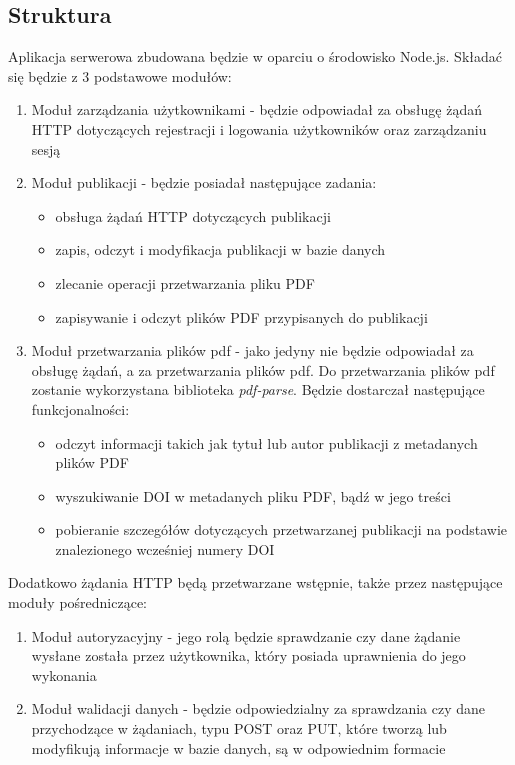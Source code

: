 \documentclass[a4paper,12pt,twoside,openany]{report}
\begin{document}
\subsection{Struktura}
Aplikacja serwerowa zbudowana będzie w oparciu o środowisko Node.js. Składać się będzie z 3 podstawowe modułów:
\begin{enumerate}
	\item Moduł zarządzania użytkownikami - będzie odpowiadał za obsługę żądań HTTP dotyczących rejestracji i logowania użytkowników oraz zarządzaniu sesją
	
	\item Moduł publikacji - będzie posiadał następujące zadania:
	\begin{itemize}
		\item obsługa żądań HTTP dotyczących publikacji
		\item zapis, odczyt i modyfikacja publikacji w bazie danych
		\item zlecanie operacji przetwarzania pliku PDF
		\item zapisywanie i odczyt plików PDF przypisanych do publikacji
	\end{itemize}
	 
	\item Moduł przetwarzania plików pdf - jako jedyny nie będzie odpowiadał za obsługę żądań, a za przetwarzania plików pdf. Do przetwarzania plików pdf zostanie wykorzystana biblioteka \textit{pdf-parse}. Będzie dostarczał następujące funkcjonalności:
	\begin{itemize}
		\item odczyt informacji takich jak tytuł lub autor publikacji z metadanych plików PDF
		\item wyszukiwanie DOI w metadanych pliku PDF, bądź w jego treści
		\item pobieranie szczegółów dotyczących przetwarzanej publikacji na podstawie znalezionego wcześniej numery DOI
	\end{itemize}
\end{enumerate}


Dodatkowo żądania HTTP będą przetwarzane wstępnie, także przez następujące moduły pośredniczące:
\begin{enumerate}
	\item Moduł autoryzacyjny - jego rolą będzie sprawdzanie czy dane żądanie wysłane została przez użytkownika, który posiada uprawnienia do jego wykonania
	\item Moduł walidacji danych - będzie odpowiedzialny za sprawdzania czy dane przychodzące w żądaniach, typu POST oraz PUT, które tworzą lub modyfikują informacje w bazie danych, są w odpowiednim formacie
\end{enumerate}
\end{document}

